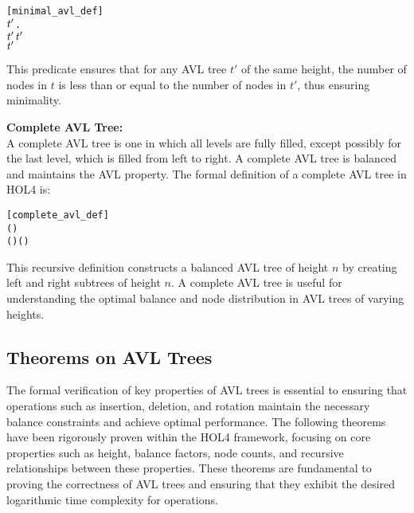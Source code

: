 \documentclass[12pt]{article}
\begin{document}
\begin{alltt}
[minimal_avl_def]
  \HOLTokenDefEquality{}
    \HOLSymConst{\HOLTokenConj{}}
  \HOLSymConst{\HOLTokenForall{}}\ensuremath{\HOLBoundVar{t}\sp{\prime{}}}.
     \ensuremath{\HOLBoundVar{t}\sp{\prime{}}} \HOLSymConst{\HOLTokenConj{}}  \ensuremath{\HOLBoundVar{t}\sp{\prime{}}} \HOLSymConst{=}   \HOLSymConst{\HOLTokenImp{}}
      \HOLSymConst{\HOLTokenLeq{}}  \ensuremath{\HOLBoundVar{t}\sp{\prime{}}}
\end{alltt}

This predicate ensures that for any AVL tree \( t' \) of the same height, the number of nodes in \( t \) is less than or equal to the number of nodes in \( t' \), thus ensuring minimality.

\textbf{Complete AVL Tree:} \\
A complete AVL tree is one in which all levels are fully filled, except possibly for the last level, which is filled from left to right. A complete AVL tree is balanced and maintains the AVL property. The formal definition of a complete AVL tree in HOL4 is:

\begin{alltt}
[complete_avl_def]
  \HOLTokenDefEquality{} 
 ( ) \HOLTokenDefEquality{}
      ( ) ( )
\end{alltt}

This recursive definition constructs a balanced AVL tree of height \( n \) by creating left and right subtrees of height \( n \). A complete AVL tree is useful for understanding the optimal balance and node distribution in AVL trees of varying heights.


\subsection{Theorems on AVL Trees}
The formal verification of key properties of AVL trees is essential to ensuring that operations such as insertion, deletion, and rotation maintain the necessary balance constraints and achieve optimal performance. The following theorems have been rigorously proven within the HOL4 framework, focusing on core properties such as height, balance factors, node counts, and recursive relationships between these properties. These theorems are fundamental to proving the correctness of AVL trees and ensuring that they exhibit the desired logarithmic time complexity for operations.
\end{document}
